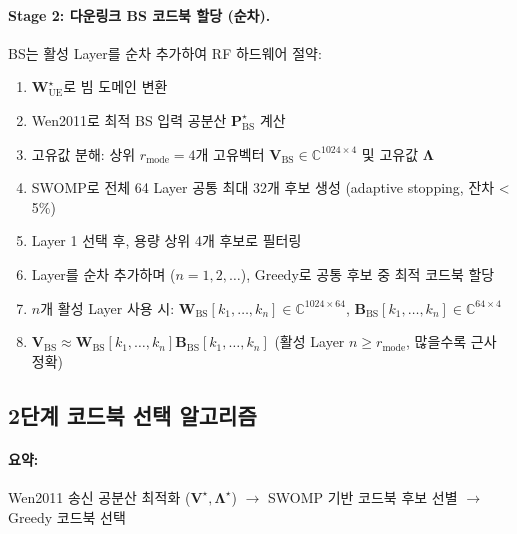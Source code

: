 \documentclass[10pt]{article}
\begin{document}
\paragraph{Stage 2: 다운링크 BS 코드북 할당 (순차).}
BS는 활성 Layer를 순차 추가하여 RF 하드웨어 절약:
\begin{enumerate}
    \item $\mathbf{W}_{\text{UE}}^{\star}$로 빔 도메인 변환
    \item Wen2011로 최적 BS 입력 공분산 $\mathbf{P}_{\text{BS}}^{\star}$ 계산
    \item 고유값 분해: 상위 $r_{\text{mode}}=4$개 고유벡터 $\mathbf{V}_{\text{BS}} \in \mathbb{C}^{1024 \times 4}$ 및 고유값 $\boldsymbol{\Lambda}$
    \item SWOMP로 전체 64 Layer 공통 최대 32개 후보 생성 (adaptive stopping, 잔차 < 5\%)
    \item Layer 1 선택 후, 용량 상위 4개 후보로 필터링
    \item Layer를 순차 추가하며 ($n=1, 2, \ldots$), Greedy로 공통 후보 중 최적 코드북 할당
    \item $n$개 활성 Layer 사용 시: $\mathbf{W}_{\text{BS}}[k_1, \ldots, k_n] \in \mathbb{C}^{1024 \times 64}$, $\mathbf{B}_{\text{BS}}[k_1, \ldots, k_n] \in \mathbb{C}^{64 \times 4}$
    \item $\mathbf{V}_{\text{BS}} \approx \mathbf{W}_{\text{BS}}[k_1, \ldots, k_n] \mathbf{B}_{\text{BS}}[k_1, \ldots, k_n]$ (활성 Layer $n \geq r_{\text{mode}}$, 많을수록 근사 정확)
\end{enumerate}

\subsection{2단계 코드북 선택 알고리즘}

\paragraph{요약:} Wen2011 송신 공분산 최적화 ($\mathbf{V}^{\star},\boldsymbol{\Lambda}^{\star}$) $\rightarrow$ SWOMP 기반 코드북 후보 선별 $\rightarrow$ Greedy 코드북 선택
\end{document}
